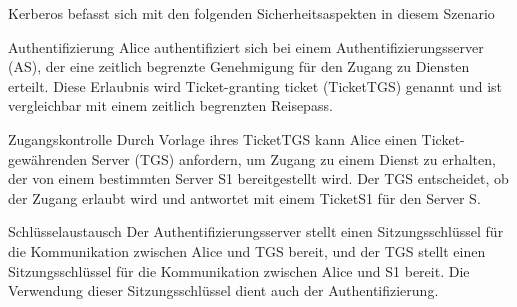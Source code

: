\documentclass[a4paper]{article}
\begin{document}
\begin{multicols}{3}
\begin{itemize*}
            \item Kerberos befasst sich mit den folgenden Sicherheitsaspekten in diesem Szenario
      \end{itemize*}
      \begin{description*}
            \item[Authentifizierung] Alice authentifiziert sich bei einem Authentifizierungsserver (AS), der eine zeitlich begrenzte Genehmigung für den Zugang zu Diensten erteilt. Diese Erlaubnis wird Ticket-granting ticket (TicketTGS) genannt und ist vergleichbar mit einem zeitlich begrenzten Reisepass.
            \item[Zugangskontrolle] Durch Vorlage ihres TicketTGS kann Alice einen Ticket-gewährenden Server (TGS) anfordern, um Zugang zu einem Dienst zu erhalten, der von einem bestimmten Server S1 bereitgestellt wird. Der TGS entscheidet, ob der Zugang erlaubt wird und antwortet mit einem TicketS1 für den Server S.
            \item[Schlüsselaustausch] Der Authentifizierungsserver stellt einen Sitzungsschlüssel für die Kommunikation zwischen Alice und TGS bereit, und der TGS stellt einen Sitzungsschlüssel für die Kommunikation zwischen Alice und S1 bereit. Die Verwendung dieser Sitzungsschlüssel dient auch der Authentifizierung.
      \end{description*}


\end{multicols}
\end{document}
